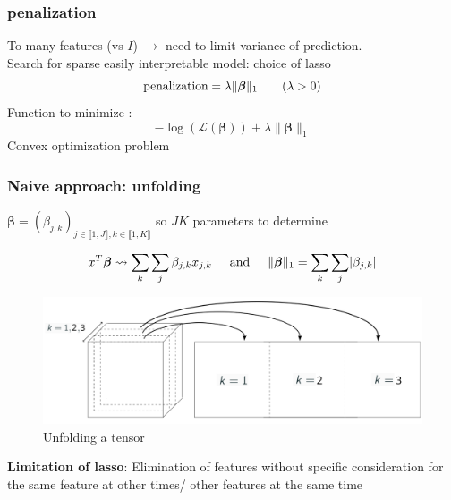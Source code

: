 \documentclass{beamer}
\begin{document}
\begin{frame}
    \frametitle{penalization}
    To many features (vs $I$) $\rightarrow$ need to limit variance of prediction.\\[10 pt]
    Search for sparse easily interpretable model: choice of lasso $$\text{penalization} = \lambda \lVert \bm{\beta} \rVert_1 \hspace{0.7 cm} (\lambda >0)$$
    Function to minimize : 
    $$- \log(\mathcal{L}(\bm{\beta})) + \lambda \lVert \bm{\beta} \rVert_1 $$
    Convex optimization problem

    
\end{frame}

\begin{frame}
    \frametitle{Naive approach: unfolding}
    \begin{center}
    $\bm{\beta} = (\beta_{j,k})_{j \in \llbracket 1, J\rrbracket, k \in \llbracket 1, K\rrbracket}$ so $JK$ parameters to determine\\[15 pt]
    \end{center}
    $$x^T \bm{\beta} \leadsto \sum\limits_{k}\sum\limits_{j}  \beta_{j,k} x_{j,k} \hspace{0.5 cm} \text{and} \hspace{0.5 cm} \lVert \bm{\beta} \rVert_1 = \sum\limits_{k}\sum\limits_{j} \lvert \beta_{j,k} \rvert$$
    \begin{figure}
        \centering
        \includegraphics[scale = 0.15]{images/deplier.png}
        \caption{Unfolding a tensor}
    \end{figure}
    \textbf{Limitation of lasso}: Elimination of features without specific consideration for the same feature at other times/ other features at the same time
    
\end{frame}
\end{document}
